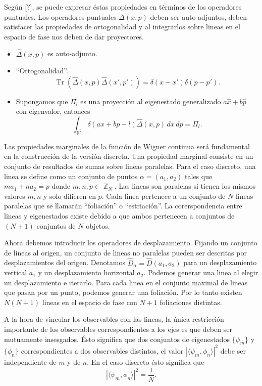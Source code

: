 \documentclass[a4paper]{report}
\DeclareMathOperator{\R}{\mathbb{R}}
\DeclareMathOperator{\Z}{\mathbb{Z}}
\DeclareMathOperator{\Tr}{Tr}
\begin{document}
  Según [?], se puede expresar éstas propiedades en términos
  de los operadores puntuales. Los operadores puntuales
  $\Delta(x,p)$ deben ser auto-adjuntos, deben satisfacer
  las propiedades de ortogonalidad y al integrarlos sobre
  lineas en el espacio de fase nos deben de dar proyectores.

  \begin{itemize}
    \item $\hat{\Delta}(x,p)$ es auto-adjunto.
    \item ``Ortogonalidad''. 
      \[
        \Tr\left( \hat{\Delta}(x,p) \hat{\Delta}(x',p')
        \right)
        = \delta(x-x')\delta(p-p').
      \] 
    \item Supongamos que $\Pi_l$ es una proyección al
      eigenestado generalizado $a \hat{x} + b \hat{p}$ con
      eigenvalor, entonces
      \[
        \int_{\R^2} \delta(ax + bp - l) \hat{\Delta}(x,p) \,
        dx \, dp
        = \Pi_l.
      \] 
  \end{itemize}

  

  Las propiedades marginales de la función de Wigner
  continua será fundamental en la construcción de la versión
  discreta. Una propiedad marginal consiste en un conjunto
  de resultados de sumas sobre lineas paralelas. Para el
  caso discreto, una linea se define como un conjunto de
  puntos $\alpha = (a_1,a_2)$ tales que $ma_1 + na_2 = p$ 
  donde $m, n, p \in \Z_N$. Las lineas son paralelas si
  tienen los mismos valores $m,n$ y solo difieren en $p$.
  Cada linea pertenece a un conjunto de $N$ lineas paralelas
  que se llamarán ``foliación'' o ``estriación''. La
  corerspondencia entre lineas y eigenestados existe debido
  a que ambos pertenecen a conjuntos de $(N+1)$ conjuntos de
  $N$ objetos.

  Ahora debemos introducir los operadores de desplazamiento.
  Fijando un conjunto de lineas al origen, un conjunto de
  lineas no paralelas pueden ser descritas por
  desplazamientos del origen. Denotamos $\hat{D}_\alpha =
  \hat{D}(a_1,a_2)$ para un desplazamiento vertical $a_1$ y
  un desplazamiento horizontal $a_2$. Podemos generar una
  linea al elegir un desplazamiento e iterarlo. Para cada
  linea en el conjunto maximal de lineas que pasan por un
  punto, podemos generar una foliación. Por lo tanto existen
  $N(N+1)$ lineas en el espacio de fase con $N+1$ 
  foliaciones distintas.

  A la hora de vincular los observables con las lineas, la
  única restricción importante de los observables
  correspondientes a los ejes es que deben ser mutuamente
  insesgados. Ésto significa que dos conjuntos de
  eigenestados $\{\psi_m\}$ y $\{\phi_n\}$ correspondientes
  a dos observables distintos, el valor $|\langle \psi_m,
  \phi_n \rangle|^2$ debe ser independiente de $m$ y de $n$.
  En el caso discreto ésto significa que
  \[
    |\langle \psi_m, \phi_n \rangle|^2 = \frac{1}{N}.
  \] 
\end{document}
